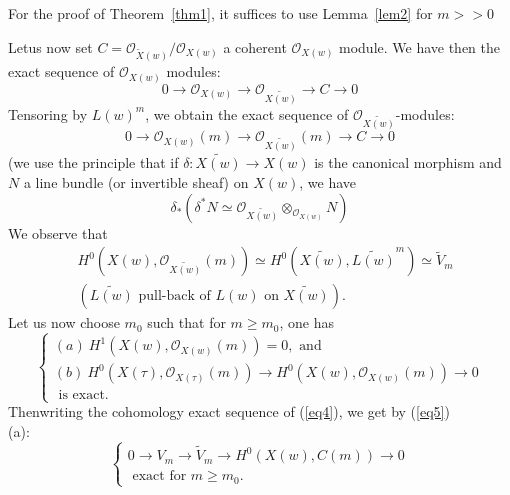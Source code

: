 \begin{rem}\label{rem1}
For the proof of Theorem~\ref{thm1}, it suffices to use Lemma~\ref{lem2} for $m>>0$ 

Let\pageoriginale us now set 
$C=\mathscr{O}_{\widetilde{X}(w)}/\mathscr{O}_{X(w)}$ a coherent $\mathscr{O}_{X(w)}$ module. We have then the exact sequence of $\mathscr{O}_{X(w)}$ modules: 
$$
0\to \mathscr{O}_{X(w)}\to \mathscr{O}_{\widetilde{X(w)}}\to C\to 0
$$
Tensoring by $L(w)^{m}$, we obtain the exact sequence of $\mathscr{O}_{\widetilde{X(w)}}$-modules: 
\begin{equation*}\label{eq4}
0\to \mathscr{O}_{X(w)}(m)\to \mathscr{O}_{\widetilde{X(w)}}(m)\to C\to 0\tag{4}
\end{equation*}
(we use the principle that if $\delta:\widetilde{X(w)}\to X(w)$ is the canonical morphism and $N$ a line bundle (or invertible sheaf) on $X(w)$, we have 
\begin{equation*}
\delta_{\ast}\left(\delta^{\ast}N\simeq \mathscr{O}_{\widetilde{X(w)}}\otimes_{\mathscr{O}_{X(w)}} N\right)
\end{equation*}
We observe that 
\begin{equation*}
\begin{aligned}
&H^{0}(X(w), \mathscr{O}_{\widetilde{X(w)}}(m))\simeq H^{0} \left(\widetilde{X(w)}, \widetilde{L(w)}^{m}\right)\simeq \widetilde{V}_m\\ &{}\left(\widetilde{L(w)} \text{ pull-back of } L(w) \text{ on } \widetilde{X(w)}\right).
\end{aligned}
\end{equation*}
Let us now choose $m_0$ such that for $m\geq m_0$, one has 
\begin{equation*}\label{eq5}
\begin{cases}
(a)~ H^{1}(X(w), \mathscr{O}_{X(w)}(m))=0, \text{ and }\\
(b)~ H^{0}(X(\tau), \mathscr{O}_{X(\tau)}(m))\to H^{0}(X(w), \mathscr{O}_{X(w)}(m))\to 0\\
\text{ is exact. }
\end{cases}\tag{5}
\end{equation*}
Then\pageoriginale writing the cohomology exact sequence of (\ref{eq4}), we get by (\ref{eq5})\\(a): 
\begin{equation*}\label{eq6}
\begin{cases}
0\to V_m\to \widetilde{V}_m \to H^{0}(X(w), C(m))\to 0\\
\text{ exact for } m\geq m_0. 
\end{cases}\tag{6}

\end{equation*}
\end{rem}
